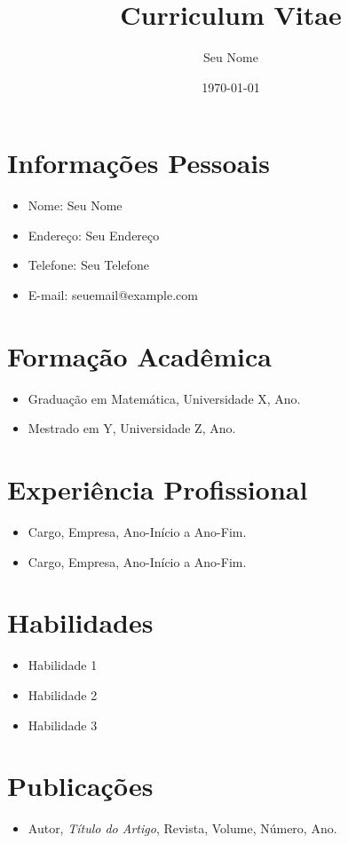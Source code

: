 \documentclass[a4paper,12pt]{article}
\begin{document}
\title{Curriculum Vitae}
\author{Seu Nome}
\date{\today}
\maketitle

\section{Informações Pessoais}
\begin{itemize}
    \item Nome: Seu Nome
    \item Endereço: Seu Endereço
    \item Telefone: Seu Telefone
    \item E-mail: seuemail@example.com
\end{itemize}

\section{Formação Acadêmica}
\begin{itemize}
    \item Graduação em Matemática, Universidade X, Ano.
    \item Mestrado em Y, Universidade Z, Ano.
\end{itemize}

\section{Experiência Profissional}
\begin{itemize}
    \item Cargo, Empresa, Ano-Início a Ano-Fim.
    \item Cargo, Empresa, Ano-Início a Ano-Fim.
\end{itemize}

\section{Habilidades}
\begin{itemize}
    \item Habilidade 1
    \item Habilidade 2
    \item Habilidade 3
\end{itemize}

\section{Publicações}
\begin{itemize}
    \item Autor, \textit{Título do Artigo}, Revista, Volume, Número, Ano.
\end{itemize}
\end{document}
